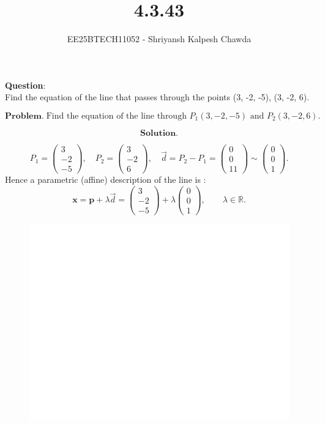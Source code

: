 \documentclass[journal]{IEEEtran}
\begin{document}
	
	
	\vspace{3cm}
	
	\title{4.3.43}
	\author{EE25BTECH11052 - Shriyansh Kalpesh Chawda}
	
	{\let\newpage\relax\maketitle}
	
	\renewcommand{\thefigure}{\theenumi}
	\renewcommand{\thetable}{\theenumi}
	\setlength{\intextsep}{10pt} 
	
	\renewcommand{\thetable}{\theenumi}
	\textbf{Question}:\\
	Find the equation of the line that passes through the points (3, -2, -5), (3, -2, 6).
	\\
	\solution

\[
\textbf{Problem.}\;
\text{Find the equation of the line through }P_1(3,-2,-5)\text{ and }P_2(3,-2,6).
\]

\[
\textbf{Solution.}
\]

\[
P_1=\begin{pmatrix}3\\-2\\-5\end{pmatrix},\quad
P_2=\begin{pmatrix}3\\-2\\ 6\end{pmatrix},\quad
\vec d=P_2-P_1=\begin{pmatrix}0\\0\\11\end{pmatrix}\sim\begin{pmatrix}0\\0\\1\end{pmatrix}.
\]
Hence a parametric (affine) description of the line is :
\[
\mathbf{x}=\mathbf{p}+\lambda\vec d
=\begin{pmatrix}3\\-2\\-5\end{pmatrix}
+\lambda\begin{pmatrix}0\\0\\1\end{pmatrix},\qquad \lambda\in\mathbb{R}.
\]
\begin{figure}[H]
	\centering
	\includegraphics[width=0.6\linewidth]{Figs/line3d}
	\caption{}
	\label{fig:line3d}
\end{figure}
\end{document}
